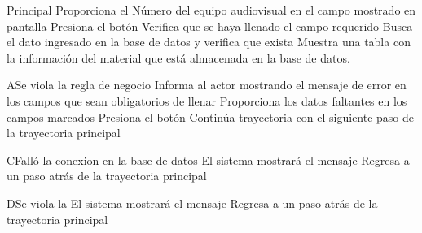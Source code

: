
\begin{UCtrayectoria}{Principal}
		\UCpaso[\UCactor] Proporciona el Número del equipo audiovisual en el campo mostrado en pantalla 
		\UCpaso[\UCactor] Presiona el botón 
		\UCpaso[\UCsist] Verifica que se haya llenado el campo requerido 
		\UCpaso[\UCsist] Busca el dato ingresado en la base de datos  y verifica que exista 
		\UCpaso[\UCsist] Muestra una tabla con la información del material que está almacenada en la base de datos.
\end{UCtrayectoria}



\begin{UCtrayectoriaA}{A}{Se viola la regla de negocio }	
			\UCpaso[\UCsist] Informa al actor mostrando el mensaje de error  en los campos que sean obligatorios de llenar
			\UCpaso[\UCactor] Proporciona los datos faltantes en los campos marcados 
			\UCpaso[\UCactor] Presiona el botón 
			\UCpaso[\UCsist] Continúa trayectoria con el siguiente paso de la trayectoria principal 
\end{UCtrayectoriaA}

\begin{UCtrayectoriaA}{C}{Falló la conexion en la base de datos}
			\UCpaso[\UCsist] El sistema mostrará el mensaje 
			\UCpaso[\UCsist] Regresa a un paso atrás de la trayectoria principal 
\end{UCtrayectoriaA}

\begin{UCtrayectoriaA}{D}{Se viola la }
			\UCpaso[\UCsist] El sistema mostrará el mensaje 
			\UCpaso[\UCsist] Regresa a un paso atrás de la trayectoria principal 
\end{UCtrayectoriaA}






